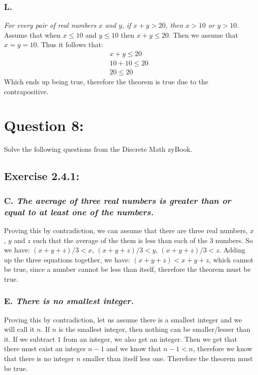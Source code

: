 \documentclass[titlepage]{article}\pagestyle{empty}
\begin{document}
\subsubsection*{L.}
\textit{For every pair of real numbers $x$ and $y$, if $x + y > 20$, then $x > 10$ or $y > 10$.}\\
Assume that when $x \le 10$ and $y \le 10$ then $x + y \le 20$. Then we assume that $x = y = 10$. Thus it follows that:
\begin{displaymath}
\begin{array}{c}
x + y \le 20\\
10 + 10 \le 20\\
20 \le 20
\end{array}
\end{displaymath}
Which ends up being true, therefore the theorem is true due to the contrapositive.

\pagebreak
\section*{Question 8:}
Solve the following questions from the Discrete Math zyBook.
\subsection*{Exercise 2.4.1:}
\subsubsection*{C. \textit{The average of three real numbers is greater than or equal to at least one of the numbers.}}
Proving this by contradiction, we can assume that there are three real numbers, $x$, $y$ and $z$ such that the average of the them is less than each of the 3 numbers. So we have: $(x + y + z)/3 < x$, $(x + y + z)/3 < y$, $(x + y + z)/3 < z$. Adding up the three equations together, we have: $(x + y + z) < x + y + z$, which cannot be true, since a number cannot be less than itself, therefore the theorem must be true.

\subsubsection*{E. \textit{There is no smallest integer.}}
Proving this by contradiction, let us assume there is a smallest integer and we will call it $n$. If $n$ is the smallest integer, then nothing can be smaller/lesser than it. If we subtract $1$ from an integer, we also get an integer. Then we get that there must exist an integer $n - 1$ and we know that $n - 1 < n$, therefore we know that there is no integer $n$ smaller than itself less one. Therefore the theorem must be true.
\end{document}
